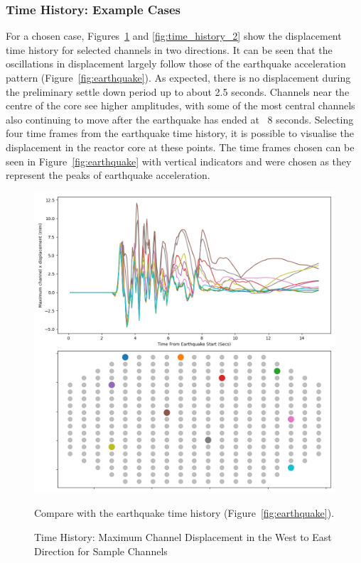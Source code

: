 \subsubsection{Time History: Example Cases}


For a chosen case, Figures~\ref{fig:time_history_1} and \ref{fig:time_history_2} show the displacement time history for selected channels in two directions. It can be seen that the oscillations in displacement largely follow those of the earthquake acceleration pattern (Figure~\ref{fig:earthquake}). As expected, there is no displacement during the preliminary settle down period up to about 2.5 seconds. Channels near the centre of the core see higher amplitudes, with some of the most central channels also continuing to move after the earthquake has ended at ~8 seconds.  
Selecting four time frames from the earthquake time history, it is possible to visualise the displacement in the reactor core at these points. The time frames chosen can be seen in Figure~\ref{fig:earthquake} with vertical indicators and were chosen as they represent the peaks of earthquake acceleration. 
\\

\begin{figure}[p]
	\centering
	\includegraphics[scale=0.45]{Figures/time_history.png}
	\caption{Time History: Maximum Channel Displacement in the West to East Direction for Sample Channels} {Compare with the earthquake time history (Figure~\ref{fig:earthquake}).}
	\label{fig:time_history_1}
\end{figure}

